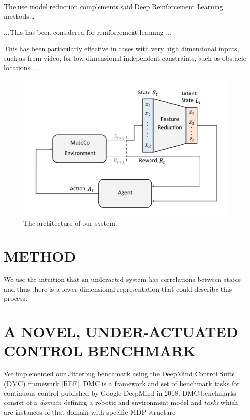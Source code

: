 \documentclass[letterpaper, 10 pt, conference]{ieeeconf}
\begin{document}
The use model reduction complements said Deep Reinforcement Learning methods...

...This has been considered for reinforcement learning ... 

This has been particularly effective in cases with very high dimensional inputs, such as from video, for low-dimensional independent constraints, such as obstacle locations \cite{finn2016deep, lynch2019learning}....

\begin{figure}[ht]
    \centering
    \includegraphics[width=\linewidth]{fig-system-arch}
    \caption{
        The architecture of our system.
    }
    \label{fig:system-arch}
\end{figure}

\section{METHOD}

We use the intuition that an underacted system has correlations between states %
and thus there is a lower-dimensional representation that could describe this process.  

\lipsum[1-4]

\section{A NOVEL, UNDER-ACTUATED CONTROL BENCHMARK}

We implemented our Jitterbug benchmark using the DeepMind Control Suite (DMC) framework [REF].
DMC is a framework and set of benchmark tasks for continuous control published by Google DeepMind in 2018.
DMC benchmarks consist of a \emph{domain} defining a robotic and environment model and \emph{tasks} which are instances of that domain with specific MDP structure
\end{document}
